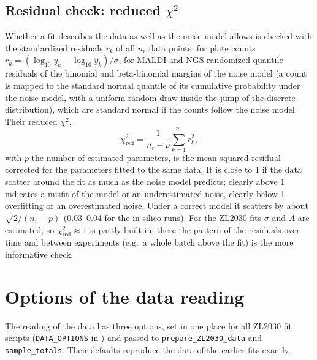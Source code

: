\documentclass[11pt,a4paper]{article}
\newcommand{\code}[1]{\texttt{#1}}
\begin{document}
\subsection*{Residual check: reduced $\chi^2$}

Whether a fit describes the data as well as the noise model allows is checked with the standardized residuals $r_k$ of all $n_r$ data points: for plate counts $r_k = (\log_{10} y_k - \log_{10} \hat y_k)/\sigma$, for MALDI and NGS randomized quantile residuals of the binomial and beta-binomial margins of the noise model (a count is mapped to the standard normal quantile of its cumulative probability under the noise model, with a uniform random draw inside the jump of the discrete distribution), which are standard normal if the counts follow the noise model. Their reduced $\chi^2$,
\begin{equation*}
\chi^2_{\mathrm{red}} = \frac{1}{n_r - p}\sum_{k=1}^{n_r} r_k^2,
\end{equation*}
with $p$ the number of estimated parameters, is the mean squared residual corrected for the parameters fitted to the same data. It is close to 1 if the data scatter around the fit as much as the noise model predicts; clearly above 1 indicates a misfit of the model or an underestimated noise, clearly below 1 overfitting or an overestimated noise. Under a correct model it scatters by about $\sqrt{2/(n_r - p)}$ (0.03--0.04 for the in-silico runs). For the ZL2030 fits $\sigma$ and $A$ are estimated, so $\chi^2_{\mathrm{red}} \approx 1$ is partly built in; there the pattern of the residuals over time and between experiments (e.g.\ a whole batch above the fit) is the more informative check.

\section{Options of the data reading}\label{sec:options}

The reading of the data has three options, set in one place for all ZL2030 fit scripts (\code{DATA\_OPTIONS} in ) and passed to \code{prepare\_ZL2030\_data} and \code{sample\_totals}. Their defaults reproduce the data of the earlier fits exactly.
\end{document}

